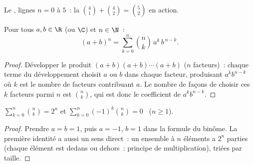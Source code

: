 \begin{omfigure}

{\small Le , lignes $n = 0$ à $5$~: la 
$\binom{4}{1} + \binom{4}{2} = \binom{5}{2}$ en action.}
\end{omfigure}

\begin{theorem}\label{thm:g12:comb:binomial}
Pour tous $a, b \in \R$ (ou $\C$) et $n \in \N$~:
\[
(a+b)^n = \sum_{k=0}^{n} \binom{n}{k}\, a^{k}\, b^{\,n-k} .
\]
\end{theorem}

\begin{proof}
Développer le produit $(a+b)(a+b)\cdots(a+b)$ ($n$ facteurs)~: chaque terme
du développement choisit $a$ ou $b$ dans chaque facteur, produisant
$a^k b^{n-k}$ où $k$ est le nombre de facteurs contribuant $a$. Le nombre
de façons de choisir ces $k$ facteurs parmi $n$ est $\binom nk$, qui est
donc le coefficient de $a^k b^{n-k}$.
\end{proof}

\begin{corollary}\label{cor:g12:comb:sums}
$\displaystyle\sum_{k=0}^{n} \binom{n}{k} = 2^n$
\quad et \quad
$\displaystyle\sum_{k=0}^{n} (-1)^k\binom{n}{k} = 0$ \ ($n \geq 1$).
\end{corollary}

\begin{proof}
Prendre $a = b = 1$, puis $a = -1$, $b = 1$ dans la formule du binôme. La
première identité a aussi un sens direct~: un ensemble à $n$ éléments a
$2^n$ parties (chaque élément est dedans ou dehors~: principe de
multiplication), triées par taille.
\end{proof}

